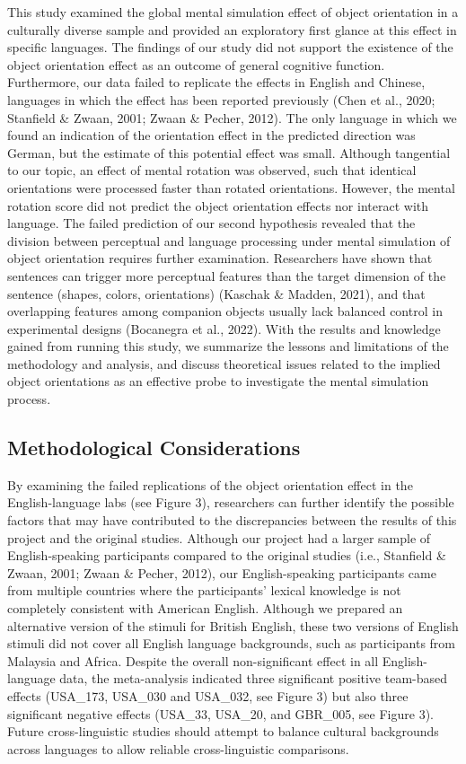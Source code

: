 \documentclass[
  man,mask,floatsintext]{apa7}
\begin{document}
This study examined the global mental simulation effect of object
orientation in a culturally diverse sample and provided an exploratory
first glance at this effect in specific languages. The findings of our
study did not support the existence of the object orientation effect as
an outcome of general cognitive function. Furthermore, our data failed
to replicate the effects in English and Chinese, languages in which the
effect has been reported previously (Chen et al., 2020; Stanfield \& Zwaan, 2001; Zwaan \& Pecher, 2012). The only
language in which we found an indication of the orientation effect in
the predicted direction was German, but the estimate of this potential
effect was small. Although tangential to our topic, an effect of mental
rotation was observed, such that identical orientations were processed
faster than rotated orientations. However, the mental rotation score did
not predict the object orientation effects nor interact with language.
The failed prediction of our second hypothesis revealed that the
division between perceptual and language processing under mental
simulation of object orientation requires further examination.
Researchers have shown that sentences can trigger more perceptual
features than the target dimension of the sentence (shapes, colors,
orientations) (Kaschak \& Madden, 2021), and that overlapping
features among companion objects usually lack balanced control in
experimental designs (Bocanegra et al., 2022). With the results and knowledge
gained from running this study, we summarize the lessons and limitations
of the methodology and analysis, and discuss theoretical issues related
to the implied object orientations as an effective probe to investigate
the mental simulation process.

\hypertarget{methodological-considerations}{%
\subsection{Methodological Considerations}\label{methodological-considerations}}

By examining the failed replications of the object orientation effect in
the English-language labs (see Figure 3), researchers can further
identify the possible factors that may have contributed to the
discrepancies between the results of this project and the original
studies. Although our project had a larger sample of English-speaking
participants compared to the original studies (i.e., Stanfield \& Zwaan, 2001; Zwaan \& Pecher, 2012), our
English-speaking participants came from multiple countries where the
participants' lexical knowledge is not completely consistent with
American English. Although we prepared an alternative version of the
stimuli for British English, these two versions of English stimuli did
not cover all English language backgrounds, such as participants from
Malaysia and Africa. Despite the overall non-significant effect in all
English-language data, the meta-analysis indicated three significant
positive team-based effects (USA\_173, USA\_030 and USA\_032, see Figure 3)
but also three significant negative effects (USA\_33, USA\_20, and
GBR\_005, see Figure 3). Future cross-linguistic studies should attempt
to balance cultural backgrounds across languages to allow reliable
cross-linguistic comparisons.
\end{document}
